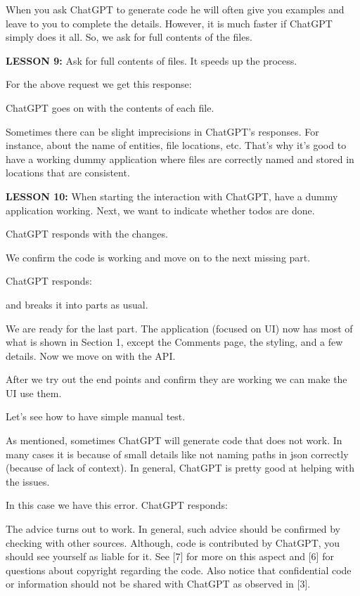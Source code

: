 \documentclass[runningheads]{llncs}
\begin{document}
When you ask ChatGPT to generate code he will often give you examples and leave to you to complete the details. However, it is much faster if ChatGPT simply does it all. So, we ask for full contents of the files.

\textbf{LESSON 9:} Ask for full contents of files. It speeds up the process.

For the above request we get this response:

ChatGPT goes on with the contents of each file.
   
Sometimes there can be slight imprecisions in ChatGPT's responses. For instance, about the name of entities, file locations, etc. That's why it's good to have a working dummy application where files are correctly named and stored in locations that are consistent.

\textbf{LESSON 10:} When starting the interaction with ChatGPT, have a dummy application working.
Next, we want to indicate whether todos are done.

ChatGPT responds with the changes.
    
We confirm the code is working and move on to the next missing part.

ChatGPT responds:

and breaks it into parts as usual.
  
We are ready for the last part. The application (focused on UI) now has most of what is shown in Section 1, except the Comments page, the
styling, and a few details. Now we move on with the API.
    
After we try out the end points and confirm they are working we can make the UI use them.

Let's see how to have simple manual test.
  
As mentioned, sometimes ChatGPT will generate code that does not work. In many cases it is because of small details like not naming paths in json correctly (because of lack of context). In general, ChatGPT is pretty good at helping with the issues.

In this case we have this error. ChatGPT responds:

The advice turns out to work. In general, such advice should be confirmed by checking with other sources. Although, code is contributed by ChatGPT, you should see yourself as liable for it. See [7] for more on this aspect and [6] for questions about copyright regarding the code. Also notice that confidential code or information should not be shared with ChatGPT as observed in [3].
  
\end{document}
